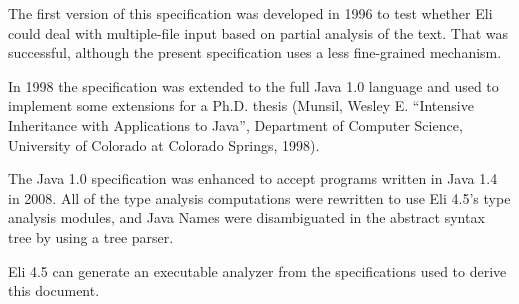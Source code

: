 The first version of this specification was developed in 1996 to test
whether Eli could deal with multiple-file input based on partial analysis
of the text.
That was successful, although the present specification uses a less
fine-grained mechanism.

In 1998 the specification was extended to the full Java 1.0 language and
used to implement some extensions for a Ph.D. thesis (Munsil, Wesley E.
``Intensive Inheritance with Applications to Java'', Department of Computer
Science, University of Colorado at Colorado Springs, 1998).

The Java 1.0 specification was enhanced to accept programs written in Java
1.4 in 2008.
All of the type analysis computations were rewritten to use Eli 4.5's type
analysis modules, and Java Names were disambiguated in the abstract syntax
tree by using a tree parser.

Eli 4.5 can generate an executable analyzer from the
specifications used to derive this document.
